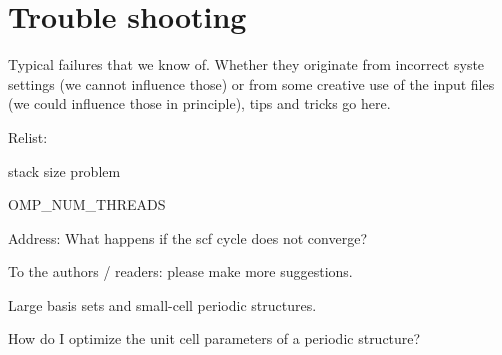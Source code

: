 \chapter{Trouble shooting}
\label{appendix_trouble_shooting}

Typical failures that we know of. Whether they originate from incorrect syste
settings (we cannot influence those) or from some creative use of the input
files (we could influence those in principle), tips and tricks go here.

Relist:

stack size problem

OMP\_NUM\_THREADS

Address: What happens if the scf cycle does not converge?

To the authors / readers: please make more suggestions.

Large basis sets and small-cell periodic structures.

How do I optimize the unit cell parameters of a periodic structure?
